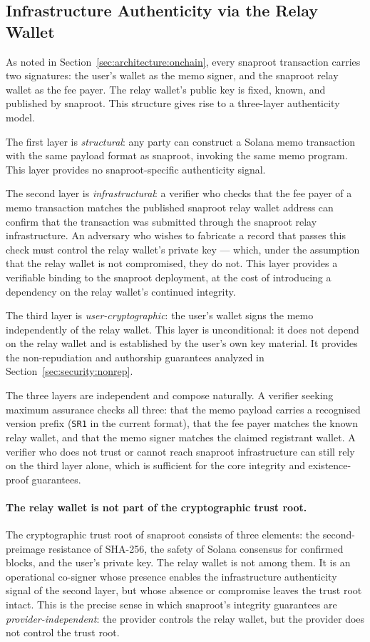 \documentclass[11pt,a4paper]{article}
\begin{document}
\subsection{Infrastructure Authenticity via the Relay Wallet}
\label{sec:security:relay}

As noted in Section~\ref{sec:architecture:onchain}, every snaproot
transaction carries two signatures: the user's wallet as the memo
signer, and the snaproot relay wallet as the fee payer. The relay
wallet's public key is fixed, known, and published by snaproot. This
structure gives rise to a three-layer authenticity model.

The first layer is \emph{structural}: any party can construct a
Solana memo transaction with the same payload format as snaproot,
invoking the same memo program. This layer provides no
snaproot-specific authenticity signal.

The second layer is \emph{infrastructural}: a verifier who checks that
the fee payer of a memo transaction matches the published snaproot relay
wallet address can confirm that the transaction was submitted through
the snaproot relay infrastructure. An adversary who wishes to
fabricate a record that passes this check must control the relay
wallet's private key --- which, under the assumption that the relay
wallet is not compromised, they do not. This layer provides a
verifiable binding to the snaproot deployment, at the cost of
introducing a dependency on the relay wallet's continued integrity.

The third layer is \emph{user-cryptographic}: the user's wallet signs
the memo independently of the relay wallet. This layer is
unconditional: it does not depend on the relay wallet and is
established by the user's own key material. It provides the
non-repudiation and authorship guarantees analyzed in
Section~\ref{sec:security:nonrep}.

The three layers are independent and compose naturally. A verifier
seeking maximum assurance checks all three: that the memo payload
carries a recognised version prefix (\texttt{SR1} in the current
format), that the fee payer matches the known relay wallet, and that
the memo signer matches the claimed registrant wallet. A verifier
who does not trust or cannot reach snaproot infrastructure can still
rely on the third layer alone, which is sufficient for the core
integrity and existence-proof guarantees.

\paragraph{The relay wallet is not part of the cryptographic trust root.}
The cryptographic trust root of snaproot consists of three elements:
the second-preimage resistance of SHA-256, the safety of Solana
consensus for confirmed blocks, and the user's private key. The relay
wallet is not among them. It is an operational co-signer whose
presence enables the infrastructure authenticity signal of the second
layer, but whose absence or compromise leaves the trust root intact.
This is the precise sense in which snaproot's integrity guarantees
are \emph{provider-independent}: the provider controls the relay
wallet, but the provider does not control the trust root.
\end{document}
